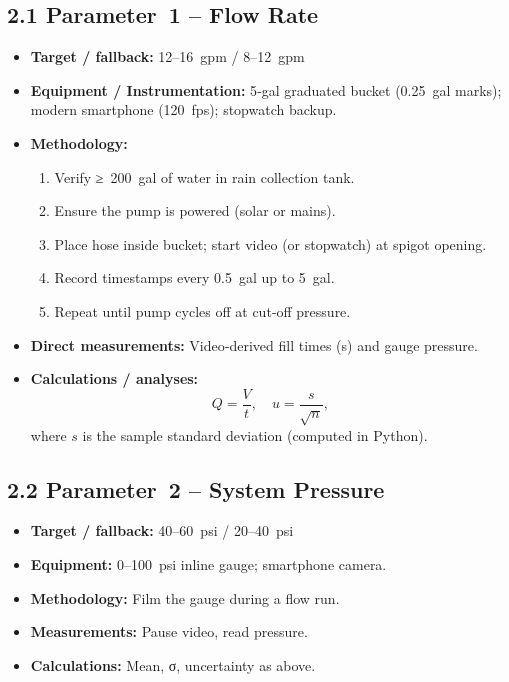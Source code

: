 \documentclass[12pt]{article}
\begin{document}
\subsection*{2.1 Parameter 1 – Flow Rate}
\begin{itemize}[leftmargin=*]
  \item \textbf{Target / fallback:} 12–16 gpm / 8–12 gpm
  \item \textbf{Equipment / Instrumentation:} 5‑gal graduated bucket (0.25 gal marks); modern smartphone (120 fps); stopwatch backup.
  \item \textbf{Methodology:}
    \begin{enumerate}[label=\arabic*., leftmargin=*]
      \item Verify ≥ 200 gal of water in rain collection tank.
      \item Ensure the pump is powered (solar or mains).
      \item Place hose inside bucket; start video (or stopwatch) at spigot opening.
      \item Record timestamps every 0.5 gal up to 5 gal.
      \item Repeat until pump cycles off at cut‐off pressure.
    \end{enumerate}
  \item \textbf{Direct measurements:} Video‐derived fill times (s) and gauge pressure.
  \item \textbf{Calculations / analyses:}
    \[
      Q = \frac{V}{t}, 
      \quad
      u = \frac{s}{\sqrt{n}},
    \]
    where $s$ is the sample standard deviation (computed in Python).
\end{itemize}

\subsection*{2.2 Parameter 2 – System Pressure}
\begin{itemize}[leftmargin=*]
  \item \textbf{Target / fallback:} 40–60 psi / 20–40 psi
  \item \textbf{Equipment:} 0–100 psi inline gauge; smartphone camera.
  \item \textbf{Methodology:} Film the gauge during a flow run.
  \item \textbf{Measurements:} Pause video, read pressure.
  \item \textbf{Calculations:} Mean, σ, uncertainty as above.
\end{itemize}
\end{document}
